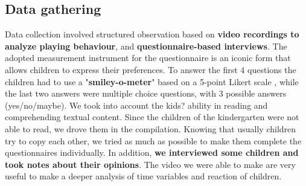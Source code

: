 \documentclass[a4paper,11pt]{report}
\begin{document}
\subsection{Data gathering} 
Data collection involved structured observation based on \textbf{video recordings to analyze playing behaviour}, and \textbf{questionnaire-based interviews}. The adopted measurement instrument for the questionnaire is an iconic form that allows children to express their preferences. To answer the first 4 questions the children had to use a "\textbf{smiley-o-meter}" based on a 5-point Likert scale \cite{smileyometer}, while the last two answers were multiple choice questions, with 3 possible answers (yes/no/maybe). We took into account the kids? ability in reading and comprehending textual content. Since the children of the kindergarten were not able to read, we drove them in the compilation. Knowing that usually children try to copy each other, we tried as much as possible to make them complete the questionnaires individually. 
In addition, \textbf{we interviewed some children and took notes about their opinions}. 
The video we were able to make are very useful to make a deeper analysis of time variables and reaction of children. 
\end{document}

